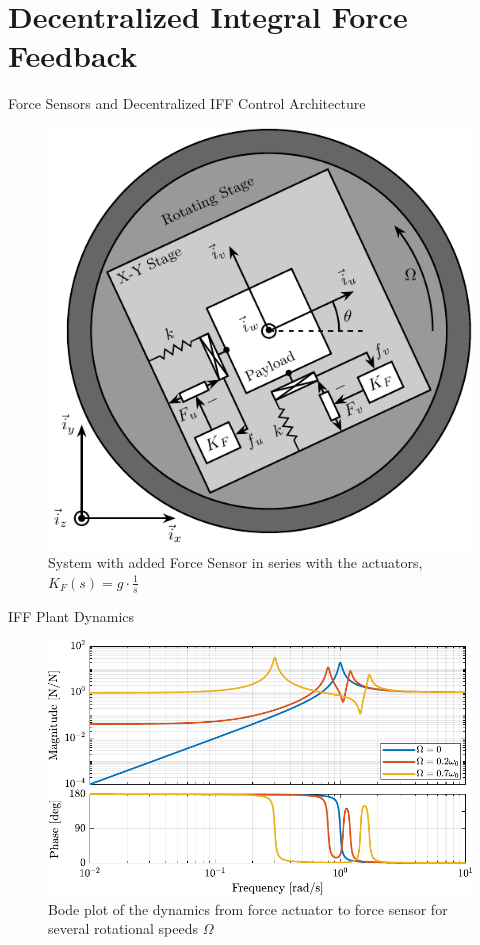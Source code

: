 \documentclass[t, minted]{clean-beamer}
\begin{document}
\section{Decentralized Integral Force Feedback}
\label{sec:org8107aa6}
\begin{frame}[label={sec:org818bd83}]{Force Sensors and Decentralized IFF Control Architecture}
\begin{figure}[htbp]
\centering
\includegraphics[width=0.7\linewidth]{figs/system_iff.pdf}
\caption{System with added Force Sensor in series with the actuators, \(K_F(s) = g \cdot \frac{1}{s}\)}
\end{figure}
\end{frame}

\begin{frame}[label={sec:org159eb7e}]{IFF Plant Dynamics}
\begin{figure}[htbp]
\centering
\includegraphics[width=\linewidth]{figs/plant_iff_compare_rotating_speed.pdf}
\caption{Bode plot of the dynamics from force actuator to force sensor for several rotational speeds \(\Omega\)}
\end{figure}
\end{frame}
\end{document}
